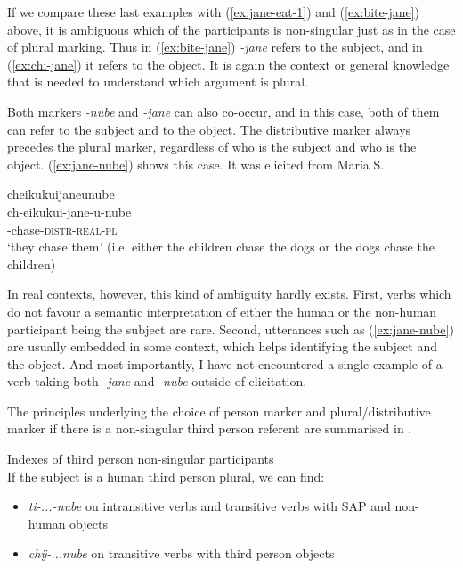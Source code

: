 If we compare these last examples with (\ref{ex:jane-eat-1}) and (\ref{ex:bite-jane}) above, it is ambiguous which of the participants is non-singular just as in the case of plural marking. Thus in (\ref{ex:bite-jane}) \textit{-jane} refers to the subject, and in (\ref{ex:chi-jane}) it refers to the object. It is again the context or general knowledge that is needed to understand which argument is plural.
 
Both markers \textit{-nube} and \textit{-jane} can also co-occur, and in this case, both of them can refer to the subject and to the object. The distributive marker always precedes the plural marker, regardless of who is the subject and who is the object. (\ref{ex:jane-nube}) shows this case. It was elicited from María S.

\ea\label{ex:jane-nube}
\begingl 
\glpreamble cheikukuijaneunube\\
\gla ch-eikukui-jane-u-nube\\ 
-chase-\textsc{distr}-\textsc{real}-\textsc{pl}\\ 
\glft ‘they chase them’ (i.e. either the children chase the dogs or the dogs chase the children)
\trailingcitation{[rxx-e141230s.211]}
\xe
 
In real contexts, however, this kind of ambiguity hardly exists. First, verbs which do not favour a semantic interpretation of either the human or the non-human participant being the subject are rare. Second, utterances such as (\ref{ex:jane-nube}) are usually embedded in some context, which helps identifying the subject and the object. And most importantly, I have not encountered a single example of a verb taking both \textit{-jane} and \textit{-nube} outside of elicitation.

The principles underlying the choice of person marker and plural/distributive marker if there is a non-singular third person referent are summarised in .

\ea
\label{exfig:3PL}
\upshape
{Indexes of third person non-singular participants}\\ 
\ea \upshape
If the subject is a human third person plural, we can find:
 \begin{itemize}
\item \textit{ti-...-nube} on intransitive verbs and transitive verbs with SAP and non-human objects
\item \textit{chÿ-...nube} on transitive verbs with third person objects
\end{itemize}

